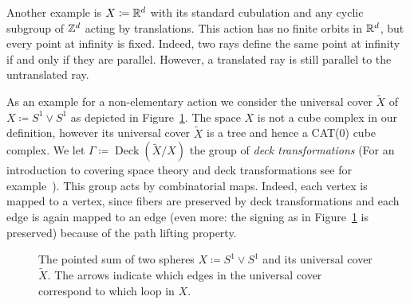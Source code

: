 \begin{bsp}[\(\R^d\)]
  Another example is \(X \coloneqq \mathbb{R}^d\) with its standard cubulation and any cyclic subgroup of \(\mathbb{Z}^d\) acting by translations. This action has no finite orbits in \(\R^d\), but every point at infinity is fixed. Indeed, two rays define the same point at infinity if and only if they are parallel. However, a translated ray is still parallel to the untranslated ray.

  As an example for a non-elementary action we consider the universal cover \(\tilde X\) of \(X \coloneqq S^1 \vee S^1\) as depicted in Figure~\ref{fig:figure-8}. The space \(X\) is not a cube complex in our definition, however its universal cover \(\tilde X\) is a tree and hence a CAT(0) cube complex. We let \(\Gamma \coloneqq \operatorname{Deck}(\tilde X/X)\) the group of \emph{deck transformations} (For an introduction to covering space theory and deck transformations see for example~\cite[Section~1.3]{hatcher}). This group acts by combinatorial maps. Indeed, each vertex is mapped to a vertex, since fibers are preserved by deck transformations and each edge is again mapped to an edge (even more: the signing as in Figure~\ref{fig:figure-8} is preserved) because of the path lifting property. 
  \begin{figure}[htbp]
    \centering
    
    \caption{The pointed sum of two spheres \(X \coloneqq S^1 \vee S^1\) and its universal cover\(\tilde X\). The arrows indicate which edges in the universal cover correspond to which loop in \(X\).}
    \label{fig:figure-8}
  \end{figure}


\end{bsp}

